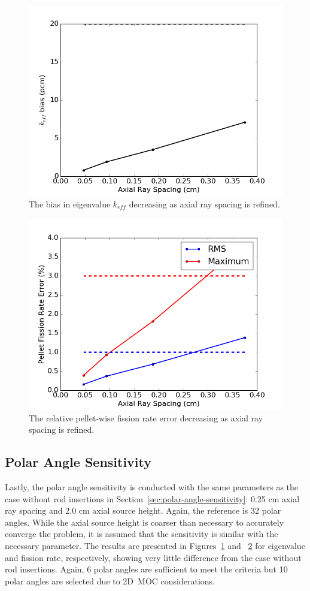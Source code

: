 \begin{figure}[h!]
	\centering
	\includegraphics[width=0.7\linewidth]{figures/results/sensitivity/rodded_z_spacing_pcm.png}
	\caption[]{The bias in eigenvalue $k_{\textit{eff}}$ decreasing as axial ray spacing is refined.}
	\label{fig:rodded-axial-rs-pcm}
\end{figure}
\begin{figure}[h!]
	\centering
	\includegraphics[width=0.7\linewidth]{figures/results/sensitivity/rodded_z_spacing_fr.png}
	\caption[]{The relative pellet-wise fission rate error decreasing as axial ray spacing is refined.}
	\label{fig:rodded-axial-rs-fr}
\end{figure}

\subsection{Polar Angle Sensitivity}

Lastly, the polar angle sensitivity is conducted with the same parameters as the case without rod insertions in Section~\ref{sec:polar-angle-sensitivity}: 0.25 cm axial ray spacing and 2.0 cm axial source height. Again, the reference is 32 polar angles. While the axial source height is coarser than necessary to accurately converge the problem, it is assumed that the sensitivity is similar with the necessary parameter. The results are presented in Figures~\ref{fig:rodded-axial-rs-pcm} and ~\ref{fig:rodded-axial-rs-fr} for eigenvalue and fission rate, respectively, showing very little difference from the case without rod insertions. Again, 6 polar angles are sufficient to meet the criteria but 10 polar angles are selected due to 2D~\ac{MOC} considerations.

